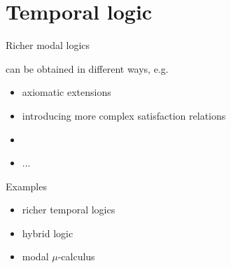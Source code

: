 \documentclass{beamer}
\begin{document}
 \section{Temporal logic}


\begin{slide}{Richer modal logics}\label{s:40}
\small

can be obtained in different ways, e.g.

\begin{itemize}
\item axiomatic extensions
\item introducing more complex satisfaction relations
\item {}
\item ...
\end{itemize}
 
 Examples
 \begin{itemize}
 \item richer temporal logics
\item hybrid logic
 \item modal $\mu$-calculus 
\end{itemize}
\end{slide}
\end{document}
